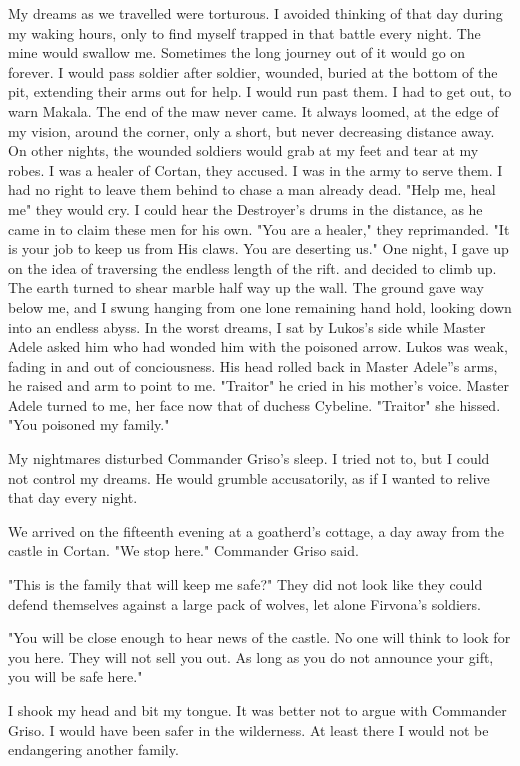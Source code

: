 \documentclass{article}
\begin{document}
My dreams as we travelled were torturous. I avoided thinking of that day during my waking hours, only to find myself trapped in that battle every night. The mine would swallow me. Sometimes the long journey out of it would go on forever. I would pass soldier after soldier, wounded, buried at the bottom of the pit, extending their arms out for help. I would run past them. I had to get out, to warn Makala. The end of the maw never came. It always loomed, at the edge of my vision, around the corner, only a short, but never decreasing distance away. On other nights, the wounded soldiers would grab at my feet and tear at my robes. I was a healer of Cortan, they accused. I was in the army to serve them. I had no right to leave them behind to chase a man already dead. "Help me, heal me" they would cry. I could hear the Destroyer's drums in the distance, as he came in to claim these men for his own. "You are a healer," they reprimanded. "It is your job to keep us from His claws. You are deserting us." One night, I gave up on the idea of traversing the endless length of the rift. and decided to climb up. The earth turned to shear marble half way up the wall. The ground gave way below me, and I swung hanging from one lone remaining hand hold, looking down into an endless abyss. In the worst dreams, I sat by Lukos's side while Master Adele asked him who had wonded him with the poisoned arrow. Lukos was weak, fading in and out of conciousness. His head rolled back in Master Adele''s arms, he raised and arm to point to me. "Traitor" he cried in his mother's voice. Master Adele turned to me, her face now that of duchess Cybeline. "Traitor" she hissed. "You poisoned my family."

My nightmares disturbed Commander Griso's sleep. I tried not to, but I could not control my dreams. He would grumble accusatorily, as if I wanted to relive that day every night. 

We arrived on the fifteenth evening at a goatherd's cottage, a day away from the castle in Cortan. "We stop here." Commander Griso said.

"This is the family that will keep me safe?" They did not look like they could defend themselves against a large pack of wolves, let alone Firvona's soldiers. 

"You will be close enough to hear news of the castle. No one will think to look for you here. They will not sell you out. As long as you do not announce your gift, you will be safe here."

I shook my head and bit my tongue. It was better not to argue with Commander Griso. I would have been safer in the wilderness. At least there I would not be endangering another family.
\end{document}
